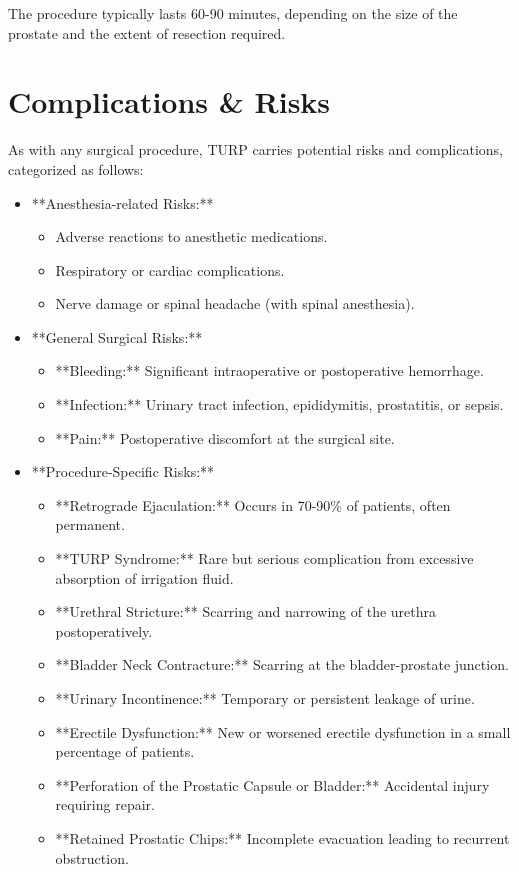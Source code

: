 The procedure typically lasts 60-90 minutes, depending on the size of the prostate and the extent of resection required.

\section*{Complications \& Risks}
As with any surgical procedure, TURP carries potential risks and complications, categorized as follows:

\begin{itemize}
  \item **Anesthesia-related Risks:**
    \begin{itemize}
      \item Adverse reactions to anesthetic medications.
      \item Respiratory or cardiac complications.
      \item Nerve damage or spinal headache (with spinal anesthesia).
    \end{itemize}
  
  \item **General Surgical Risks:**
    \begin{itemize}
      \item **Bleeding:** Significant intraoperative or postoperative hemorrhage.
      \item **Infection:** Urinary tract infection, epididymitis, prostatitis, or sepsis.
      \item **Pain:** Postoperative discomfort at the surgical site.
    \end{itemize}
  
  \item **Procedure-Specific Risks:**
    \begin{itemize}
      \item **Retrograde Ejaculation:** Occurs in 70-90\% of patients, often permanent.
      \item **TURP Syndrome:** Rare but serious complication from excessive absorption of irrigation fluid.
      \item **Urethral Stricture:** Scarring and narrowing of the urethra postoperatively.
      \item **Bladder Neck Contracture:** Scarring at the bladder-prostate junction.
      \item **Urinary Incontinence:** Temporary or persistent leakage of urine.
      \item **Erectile Dysfunction:** New or worsened erectile dysfunction in a small percentage of patients.
      \item **Perforation of the Prostatic Capsule or Bladder:** Accidental injury requiring repair.
      \item **Retained Prostatic Chips:** Incomplete evacuation leading to recurrent obstruction.
    \end{itemize}
\end{itemize}

